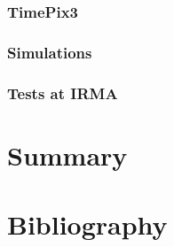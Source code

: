 \begin{refsection}
	\subsubsection{TimePix3}
	\subsubsection{Simulations}
	\subsubsection{Tests at IRMA}

	\section{Summary}
	\label{ch3:Summary}

	\cleardoublepage
	\section{Bibliography}
	\label{ch3:bib}
	\printbibliography[heading=subbibliography]
\end{refsection}